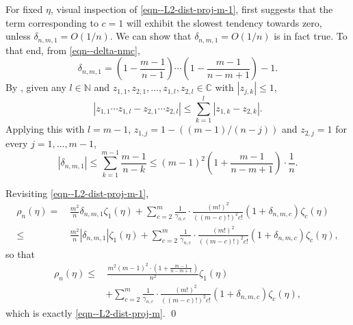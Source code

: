 \documentclass[12pt]{article}
\numberwithin{equation}{section}
\theoremstyle{definition}
\theoremstyle{plain}
\begin{document}
For fixed \(\eta\), visual inspection of \eqref{eqn--L2-dist-proj-m-1}, first
suggests that the term corresponding to \(c = 1\) will exhibit the slowest
tendency towards zero, unless \(\delta_{n, m, 1} = O (1 / n)\).
We can show that \(\delta_{n, m, 1} = O (1 / n)\) is in fact true.
To that end, from \eqref{eqn--delta-nmc},
\begin{equation*}
  \delta_{n, m, 1} = \left( 1 - \frac{m - 1}{n - 1} \right) \cdots \left( 1 -
  \frac{m - 1}{n - m + 1}  \right) - 1.
\end{equation*}
By \citet[Lemma 1, p. 358]{1995billingsleyProbabilityMeasure},
given any \(l \in \mathbb{N}\) and \(z_{1, 1}, z_{2, 1}, \dots, z_{1, l}, z_{2,
l} \in \mathbb{C}\) with \(\left| z_{j, k} \right| \leq 1\),
\begin{equation*}
  \left| z_{1, 1} \cdots z_{1, l} - z_{2, 1} \cdots z_{2, l} \right| \leq
  \sum_{k = 1}^{l} \left| z_{1, k} - z_{2, k} \right|.
\end{equation*}
Applying this with \(l = m - 1\), \(z_{1, j} = 1 - ((m - 1) / (n - j))\) and
\(z_{2, j} = 1\) for every \(j = 1, \dots, m - 1\),
\begin{equation}
  \left| \delta_{n, m, 1} \right| \leq \sum_{k = 1}^{m - 1} \frac{m - 1}{n - k}
  \leq (m - 1)^{2} \left( 1 + \frac{m - 1}{n - m + 1} \right) \cdot \frac{1}{n}.
\end{equation}

Revisiting \eqref{eqn--L2-dist-proj-m-1},
\begin{align*}
  \rho_{n} (\eta) =
  & \, \frac{m^{2}}{n} \delta_{n, m, 1} \zeta_{1} (\eta) + \sum_{c = 2}^{m}
  \frac{1}{\gamma_{n, c}} \cdot \frac{(m !)^{2}}{((m - c)!)^{2} c!} \left( 1 +
  \delta_{n, m, c} \right) \zeta_{c} (\eta) \\
  \leq
  & \, \frac{m^{2}}{n} \left| \delta_{n, m, 1} \right| \zeta_{1} (\eta) +
  \sum_{c = 2}^{m} \frac{1}{\gamma_{n, c}} \cdot \frac{(m !)^{2}}{((m - c)!)^{2}
  c!} \left( 1 + \delta_{n, m, c} \right) \zeta_{c} (\eta),
\end{align*}
so that
\begin{equation*}
  \begin{split}
  \rho_{n} (\eta) \leq
  & \, \frac{m^{2} (m - 1)^{2} \cdot \left( 1 + \frac{m - 1}{n - m + 1}
  \right)}{n^{2}} \zeta_{1} (\eta) \\
  & + \sum_{c = 2}^{m} \frac{1}{\gamma_{n, c}} \cdot \frac{(m !)^{2}}{((m -
  c)!)^{2} c!} \left( 1 + \delta_{n, m, c} \right) \zeta_{c} (\eta),
  \end{split}
\end{equation*}
which is exactly \eqref{eqn--L2-dist-proj-m}.
\qed
\end{document}
